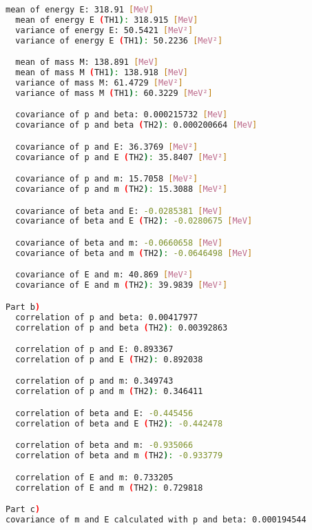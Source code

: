 \documentclass[10pt]{article}
\newenvironment{myfont}{\fontfamily{put}\selectfont}{\par}
\begin{document}
\begin{myfont}
\begin{lstlisting}[language=bash,caption={bash version}]
  mean of energy E: 318.91 [MeV]
  mean of energy E (TH1): 318.915 [MeV]
  variance of energy E: 50.5421 [MeV²]
  variance of energy E (TH1): 50.2236 [MeV²]

  mean of mass M: 138.891 [MeV]
  mean of mass M (TH1): 138.918 [MeV]
  variance of mass M: 61.4729 [MeV²]
  variance of mass M (TH1): 60.3229 [MeV²]

  covariance of p and beta: 0.000215732 [MeV]
  covariance of p and beta (TH2): 0.000200664 [MeV]

  covariance of p and E: 36.3769 [MeV²]
  covariance of p and E (TH2): 35.8407 [MeV²]

  covariance of p and m: 15.7058 [MeV²]
  covariance of p and m (TH2): 15.3088 [MeV²]

  covariance of beta and E: -0.0285381 [MeV]
  covariance of beta and E (TH2): -0.0280675 [MeV]

  covariance of beta and m: -0.0660658 [MeV]
  covariance of beta and m (TH2): -0.0646498 [MeV]

  covariance of E and m: 40.869 [MeV²]
  covariance of E and m (TH2): 39.9839 [MeV²]

Part b)
  correlation of p and beta: 0.00417977
  correlation of p and beta (TH2): 0.00392863

  correlation of p and E: 0.893367
  correlation of p and E (TH2): 0.892038

  correlation of p and m: 0.349743
  correlation of p and m (TH2): 0.346411

  correlation of beta and E: -0.445456
  correlation of beta and E (TH2): -0.442478

  correlation of beta and m: -0.935066
  correlation of beta and m (TH2): -0.933779

  correlation of E and m: 0.733205
  correlation of E and m (TH2): 0.729818

Part c)
covariance of m and E calculated with p and beta: 0.000194544
\end{lstlisting}


\end{myfont}
\end{document}
